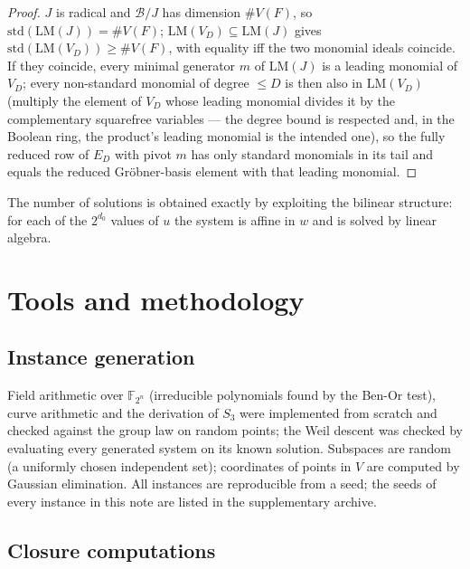 \documentclass[11pt,a4paper]{article}
\theoremstyle{remark}\newtheorem{remark}{Remark}
\newcommand{\F}{\mathbb{F}}
\newcommand{\B}{\mathcal{B}}
\newcommand{\lm}{\mathrm{LM}}
\newcommand{\std}{\mathrm{std}}
\begin{document}
\begin{proof}
$J$ is radical and $\B/J$ has dimension $\#V(F)$, so $\std(\lm(J))=\#V(F)$; $\lm(V_D)\subseteq\lm(J)$ gives $\std(\lm(V_D))\ge\#V(F)$, with equality iff the two monomial ideals coincide. If they coincide, every minimal generator $m$ of $\lm(J)$ is a leading monomial of $V_D$; every non-standard monomial of degree $\le D$ is then also in $\lm(V_D)$ (multiply the element of $V_D$ whose leading monomial divides it by the complementary squarefree variables --- the degree bound is respected and, in the Boolean ring, the product's leading monomial is the intended one), so the fully reduced row of $E_D$ with pivot $m$ has only standard monomials in its tail and equals the reduced Gröbner-basis element with that leading monomial.
\end{proof}

The number of solutions is obtained exactly by exploiting the bilinear structure: for each of the $2^{d_0}$ values of $u$ the system is affine in $w$ and is solved by linear algebra.

\section{Tools and methodology}

\subsection{Instance generation}

Field arithmetic over $\F_{2^n}$ (irreducible polynomials found by the Ben-Or test), curve arithmetic and the derivation of $S_3$ were implemented from scratch and checked against the group law on random points; the Weil descent was checked by evaluating every generated system on its known solution. Subspaces are random (a uniformly chosen independent set); coordinates of points in $V$ are computed by Gaussian elimination. All instances are reproducible from a seed; the seeds of every instance in this note are listed in the supplementary archive.

\subsection{Closure computations}\label{sec:tools}
\end{document}
